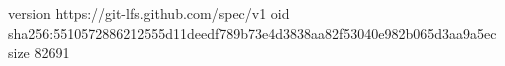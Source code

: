 version https://git-lfs.github.com/spec/v1
oid sha256:5510572886212555d11deedf789b73e4d3838aa82f53040e982b065d3aa9a5ec
size 82691
